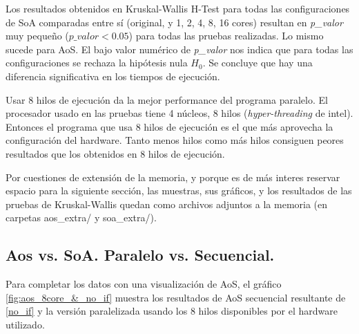 \documentclass{article}
\begin{document}
Los resultados obtenidos en Kruskal-Wallis H-Test para todas las configuraciones de SoA comparadas entre sí
(original, y 1, 2, 4, 8, 16 cores) resultan en \textit{p\_valor} muy pequeño (${p\_valor} < 0.05$) para todas
las pruebas realizadas. Lo mismo sucede para AoS. El bajo valor numérico de \textit{p\_valor} nos indica que para todas las configuraciones se rechaza
la hipótesis nula ${H_0}$. Se concluye que hay una diferencia significativa
en los tiempos de ejecución.

Usar 8 hilos de ejecución da la mejor performance del programa paralelo. El procesador
usado en las pruebas tiene 4 núcleos, 8 hilos (\textit{hyper-threading} de intel).
Entonces el programa que usa 8 hilos de ejecución es el que más aprovecha la configuración del hardware.
Tanto menos hilos como más hilos consiguen peores resultados que los obtenidos en 8 hilos de ejecución.

Por cuestiones de extensión de la memoria, y porque es de más interes reservar espacio
para la siguiente sección, las muestras, sus gráficos, y los resultados de las pruebas de Kruskal-Wallis quedan como archivos adjuntos a la memoria (en carpetas aos\_extra/ y soa\_extra/).

\subsection{Aos vs. SoA. Paralelo vs. Secuencial.\label{t-test}}
Para completar los datos con una visualización de AoS, el gráfico \ref{fig:aos_8core_&_no_if} muestra los resultados
de AoS secuencial resultante de \ref{no_if} y la versión paralelizada usando los 8 hilos disponibles
por el hardware utilizado.
\end{document}
